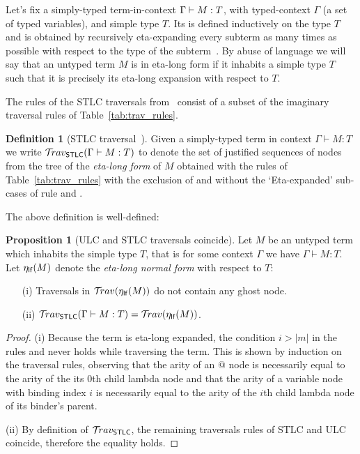 \documentclass{article}
\theoremstyle{definition}
\newtheorem{definition}{Definition}[section]
\newtheorem{proposition}{Proposition}[section]
\newcommand{\ghostlmd}{{\lambda\!\!\lambda}}
\newcommand{\travulc}{\travset}
\newcommand{\travstlc}{{\travset_{\sf STLC}}}
\begin{document}
Let's fix a simply-typed term-in-context $\Gamma \vdash M :T$, with typed-context $\Gamma$ (a set of typed variables), and simple type $T$. Its  is defined inductively on the type $T$ and is obtained by recursively eta-expanding every subterm as many times as possible with respect to the type of the subterm~\cite{Ong2006,BlumPhd}.
By abuse of language we will say that an untyped term $M$ is in eta-long form if it inhabits a simple type $T$ such that it is precisely its eta-long expansion with respect to $T$.

The rules of the STLC traversals from~\cite{BlumPhd} consist of a subset of the imaginary traversal rules of Table~\ref{tab:trav_rules}.

\begin{definition}[STLC traversal~\cite{BlumPhd}]
Given a simply-typed term in context $\Gamma \vdash M : T$ we write $\travstlc(\Gamma \vdash M : T)$ to denote the set of justified sequences of nodes from the tree of the \emph{eta-long form} of $M$ obtained with the rules of Table~\ref{tab:trav_rules} with the exclusion of \rulenamet{Lam^\ghostlmd} and without the `Eta-expanded' sub-cases of rule  and .
\end{definition}

The above definition is well-defined:
\begin{proposition}[ULC and STLC traversals coincide]
\label{prop:ulc_and_stlc_trav_coincide}
Let $M$ be an untyped term which inhabits the simple type $T$, that is for some context $\Gamma$ we have $\Gamma \vdash M : T$. Let $\eta_{\sf lf}(M)$ denote the \emph{eta-long normal form} with respect to $T$:
\begin{itemize}
\item[(i)] Traversals in $\travulc(\etalf{M})$ do not contain any ghost node.
\item[(ii)] $\travstlc(\Gamma \vdash M : T) = \travulc(\etalf{M})$.
\end{itemize}
\end{proposition}
\begin{proof}
(i) Because the term is eta-long expanded, the condition $i>|m|$ in the rules  and  never holds while traversing the term.  This is shown by induction on the traversal rules, observing that the arity of an $@$ node is necessarily equal to the arity of the its $0$th child lambda node and that the arity of a variable node with binding index $i$ is necessarily equal to the arity of the $i$th child lambda node of its binder's parent.

(ii) By definition of $\travstlc$, the remaining traversals rules of STLC and ULC coincide, therefore the equality holds.
\end{proof}
\end{document}
